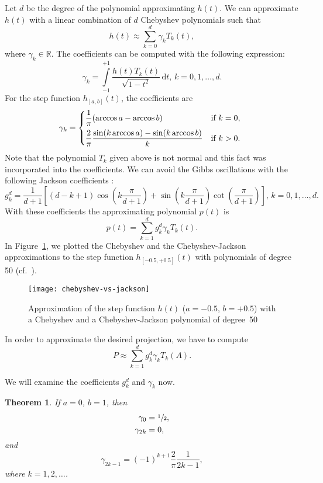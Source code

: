 \documentclass[%
	paper=a4,
	fontsize=10pt,
	DIV11,BCOR10mm,
	numbers=noenddot,
	abstract=yes
]{scrartcl}
\newcommand{\R}{\mathbb{R}}
\newtheorem{theorem}{Theorem}[section]
\theoremstyle{definition}
\begin{document}
Let $d$ be the degree of the polynomial approximating $h(t)$. We can approximate
$h(t)$ with a linear combination of $d$ Chebyshev polynomials such that
\[ h(t) \approx \sum_{k=0}^d \gamma_k T_k(t), \]
where $\gamma_k \in \R$. The coefficients can be computed with the following
expression:
\[
	\gamma_k =
	\int\limits_{-1}^{+1} \frac{h(t) T_k(t)}{\sqrt{1 - t^2}}\,\mathrm{d}t,
	\, k = 0, 1, \dotsc, d.
\]
For the step function $h_{[a,b]}(t)$, the coefficients are \cite{DiNapoli2016}
\[
	\gamma_k =
	\begin{dcases*}
		\frac{1}{\pi} (\arccos a - \arccos b) & if $k = 0$, \\
		\frac{2}{\pi} \frac{\sin(k \arccos a) - \sin(k \arccos b)}{k} &
			if $k > 0$.
	\end{dcases*}
\]
Note that the polynomial $T_k$ given above is not normal and this fact was
incorporated into the coefficients. We can avoid the Gibbs oscillations with the
following Jackson coefficients \cite[§II.C.3]{Weisse2006}:
\begin{equation}
\label{eq:jackson-coefficients}
	g_k^d =
	\frac{1}{d+1}
	\left[
		(d - k + 1) \cos\left(k \frac{\pi}{d+1}\right) +
		\sin\left(k \frac{\pi}{d+1}\right) \cot\left(\frac{\pi}{d+1}\right)
	\right], \, k = 0, 1, \dotsc, d.
\end{equation}
With these coefficients the approximating polynomial $p(t)$ is
\[ p(t) = \sum_{k=1}^d g_k^d \gamma_k T_k(t). \]
In Figure~\ref{fig:chebyshev-vs-jackson}, we plotted the Chebyshev and the
Chebyshev-Jackson approximations to the step function $h_{[-0.5,+0.5]}(t)$ with
polynomials of degree 50 (cf.~\cite[Fig.~1]{DiNapoli2016}).

\begin{figure}
	\begin{center}
		\texttt{[image: chebyshev-vs-jackson]}
	\end{center}
	\caption{Approximation of the step function $h(t)$ ($a = -0.5$, $b =
		+0.5$) with a Chebyshev and a Chebyshev-Jackson polynomial of
	degree~50}
	\label{fig:chebyshev-vs-jackson}
\end{figure}

In order to approximate the desired projection, we have to compute
\[ P \approx \sum_{k=1}^d g_k^d \gamma_k T_k(A). \]

We will examine the coefficients $g_k^d$ and $\gamma_k$ now.

\begin{theorem}
	\label{thm:chebyshev-heaviside-coefficients}
	If $a = 0$, $b = 1$, then
	\begin{align*}
		\gamma_0 &= \sfrac{1}{2}, \\
		\gamma_{2k} &= 0,
	\end{align*}
	and
	\[
		\gamma_{2k-1} = (-1)^{k+1} \frac{2}{\pi} \frac{1}{2k - 1},
	\]
	where $k = 1, 2, \dotso$.
\end{theorem}
\end{document}
